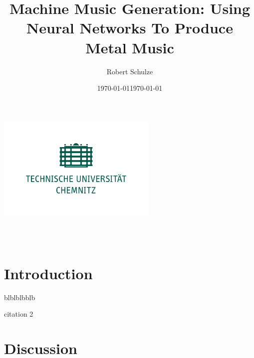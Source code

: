 \documentclass[a4paper, 11pt]{report}
\author{Robert Schulze}
\title{Machine Music Generation: Using Neural Networks To Produce Metal Music}
\date{\today}
\begin{document}
\begin{titlepage}
    \begin{center}
        \includegraphics[height=5cm]{tuc-gruen.png}
        
        \begin{large}
            \thetitle \\
            \theauthor \\
            \date{\today}  
            
        \end{large}
        
    \end{center}
\end{titlepage}

\renewcommand{\thechapter}{\Roman{chapter}}

\setcounter{page}{1} 

\tableofcontents

\chapter{Introduction}

blblblbblb\cite{zukowski2018generating}

citation 2\cite{goodfellow2016deep}

\chapter{Discussion}




\end{document}
